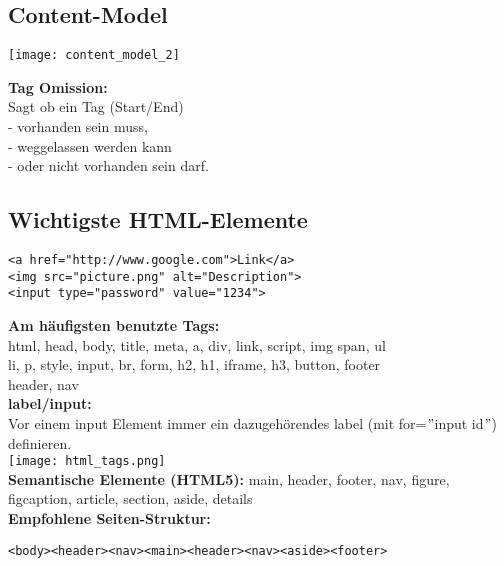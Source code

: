 \documentclass[7pt,landscape,a4paper]{scrartcl}
\begin{document}
\begin{multicols*}{4}
\subsection{Content-Model}
\begin{minipage}{0.48\linewidth}
	\texttt{[image: content\_model\_2]}
\end{minipage}
\begin{minipage}{0.52\linewidth}
	\textbf{Tag Omission:}\\
	Sagt ob ein Tag (Start/End)\\
	- vorhanden sein muss,\\
	- weggelassen werden kann\\
	- oder nicht vorhanden sein darf.
\end{minipage}
\subsection{Wichtigste HTML-Elemente}
\begin{lstlisting}[style=htmlcssjs]
<a href="http://www.google.com">Link</a>
<img src="picture.png" alt="Description">
<input type="password" value="1234">
\end{lstlisting}
	\textbf{Am häufigsten benutzte Tags:}\\
	html, head, body, title, meta, a, div, link, script, img span, ul\\
	li, p, style, input, br, form, h2, h1, iframe, h3, button, footer\\
	header, nav\\
	\textcolor{b}{\textbf{label/input:}}\\
	Vor einem input Element immer ein dazugehörendes label (mit for=$"$input id$"$) definieren. \\
	\texttt{[image: html\_tags.png]}\\
	\textcolor{b}{\textbf{Semantische Elemente (HTML5):}} main, header, footer, nav, figure, figcaption, article, section, aside, details\\
	\textcolor{b}{\textbf{Empfohlene Seiten-Struktur:}}
\begin{lstlisting}[style=htmlcssjs]
<body><header><nav><main><header><nav><aside><footer>
\end{lstlisting}

\end{multicols*}
\end{document}

